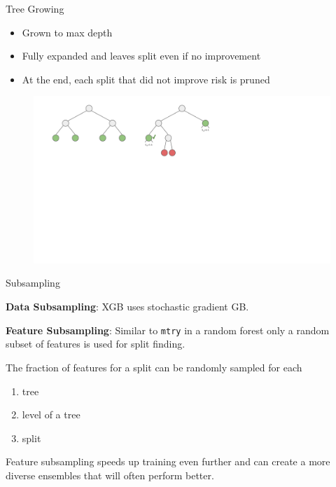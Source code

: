 \documentclass[11pt,compress,t,notes=noshow, xcolor=table]{beamer}
\begin{document}
\begin{vbframe}{Tree Growing}

  \begin{itemize}
    \item Grown to max depth 
    \item Fully expanded and leaves split even if no improvement
    \item At the end, each split that did not improve risk is pruned
  \end{itemize}

  \lz

  \begin{figure}
    \includegraphics[trim=0 260 230 20, clip, width=\textwidth,page=2]{figure_man/trees_balance.pdf}
  \end{figure}


\end{vbframe}

\begin{vbframe}{Subsampling}

  \textbf{Data Subsampling}: XGB uses stochastic gradient GB.

  \lz

  \textbf{Feature Subsampling}: Similar to \texttt{mtry} in a random forest only a random subset of features is used for split finding.

  \lz

  The fraction of features for a split can be randomly sampled for each
  \begin{enumerate}
    \item tree
    \item level of a tree
    \item split
  \end{enumerate}

  \lz

 Feature subsampling speeds up training even further and can create a more diverse ensembles that will often perform better.


\end{vbframe}
\end{document}
